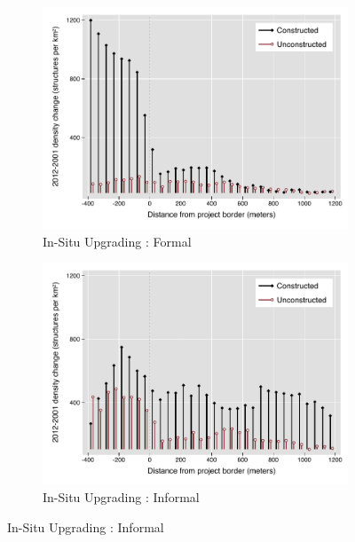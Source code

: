\documentclass[12pt]{article}
\begin{document}
\begin{figure}
        \begin{subfigure}[b]{0.495\textwidth}
            \centering
        \caption{In-Situ Upgrading : Formal}
            \includegraphics[width=\textwidth,trim={0.3cm .3cm 0.1cm 0cm}, clip=true]{figures/bblu_for_rawchanges_4_2.pdf}
        \end{subfigure}
        \hfill
        \begin{subfigure}[b]{0.495\textwidth}
            \centering
        \caption{In-Situ Upgrading : Informal}
            \includegraphics[width=\textwidth,trim={0.3cm .3cm 0.1cm 0cm}, clip=true]{figures/bblu_inf_rawchanges_4_2.pdf}

\end{subfigure}
\end{figure}
\end{document}
